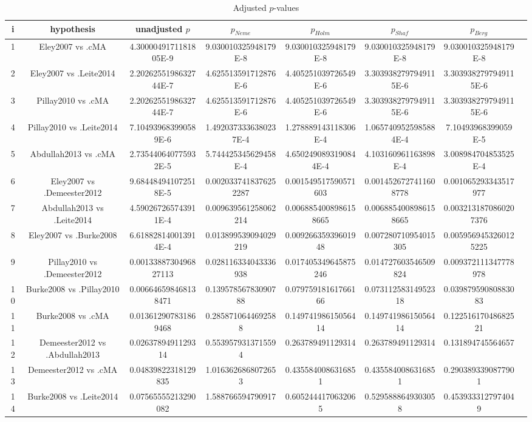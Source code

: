 \documentclass[a4paper,10pt]{article}
\begin{document}
\begin{landscape}
\begin{table}[!htp]
\centering\tiny
\caption{Adjusted $p$-values}
\begin{tabular}{cccccccc}
i&hypothesis&unadjusted $p$&$p_{Neme}$&$p_{Holm}$&$p_{Shaf}$&$p_{Berg}$\\
\hline
1&Eley2007 vs .cMA&4.3000049171181805E-9&9.030010325948179E-8&9.030010325948179E-8&9.030010325948179E-8&9.030010325948179E-8\\
2&Eley2007 vs .Leite2014&2.2026255198632744E-7&4.625513591712876E-6&4.405251039726549E-6&3.3039382797949115E-6&3.3039382797949115E-6\\
3&Pillay2010 vs .cMA&2.2026255198632744E-7&4.625513591712876E-6&4.405251039726549E-6&3.3039382797949115E-6&3.3039382797949115E-6\\
4&Pillay2010 vs .Leite2014&7.104939683990589E-6&1.4920373336380237E-4&1.278889143118306E-4&1.0657409525985884E-4&7.10493968399059E-5\\
5&Abdullah2013 vs .cMA&2.735440640775932E-5&5.744425345629458E-4&4.6502490893190844E-4&4.103160961163898E-4&3.008984704853525E-4\\
6&Eley2007 vs .Demeester2012&9.684484941072518E-5&0.0020337418376252287&0.001549517590571603&0.0014526727411608778&0.001065293343517977\\
7&Abdullah2013 vs .Leite2014&4.590267265743911E-4&0.009639561258062214&0.0068854008986158665&0.0068854008986158665&0.0032131870860207376\\
8&Eley2007 vs .Burke2008&6.618828140013914E-4&0.013899539094029219&0.00926635939601948&0.007280710954015305&0.0059569453260125225\\
9&Pillay2010 vs .Demeester2012&0.0013388730496827113&0.028116334043336938&0.017405349645875246&0.014727603546509824&0.009372111347778978\\
10&Burke2008 vs .Pillay2010&0.006646598468138471&0.13957856783090788&0.07975918161766166&0.07311258314952318&0.03987959080883083\\
11&Burke2008 vs .cMA&0.013612907831869468&0.2858710644692588&0.14974198615056414&0.14974198615056414&0.12251617048682521\\
12&Demeester2012 vs .Abdullah2013&0.0263789491129314&0.5539579313715594&0.263789491129314&0.263789491129314&0.131894745564657\\
13&Demeester2012 vs .cMA&0.04839822318129835&1.0163626868072653&0.4355840086316851&0.4355840086316851&0.2903893390877901\\
14&Burke2008 vs .Leite2014&0.07565555213290082&1.588766594790917&0.6052444170632065&0.5295888649303058&0.4539333127974049\\

\end{tabular}
\end{table}
\end{landscape}
\end{document}

